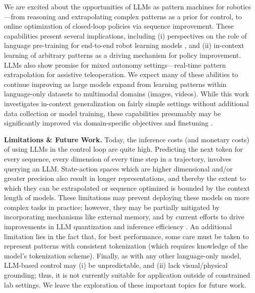 We are excited about the opportunities of LLMs as pattern machines for robotics---from reasoning and extrapolating complex patterns as a prior for control, to online optimization of closed-loop policies via sequence improvement. These capabilities present several implications, including (i) perspectives on the role of language pre-training for end-to-end robot learning models \cite{lu2021pretrained,reid2022can}, and (ii) in-context learning of arbitrary patterns as a driving mechanism for policy improvement. LLMs also show promise for mixed autonomy settings---\eg real-time pattern extrapolation for assistive teleoperation. We expect many of these abilities to continue improving as large models expand from learning  patterns within language-only datasets to multimodal domains (\eg images, videos). While this work investigates in-context generalization on fairly simple settings without additional data collection or model training, these capabilities presumably may be significantly improved via domain-specific objectives and finetuning \cite{li2022pre,driess2023palm,zhang2023motiongpt,lee2023supervised, dinh2022lift}.


\textbf{Limitations \& Future Work.} Today, the inference costs (and monetary costs) of using LLMs in the control loop are quite high. Predicting the next token for every sequence, \eg every dimension of every time step in a trajectory, involves querying an LLM. State-action spaces which are higher dimensional and/or greater precision also result in longer  representations, and thereby the extent to which they can be extrapolated or sequence optimized is bounded by the context length of models. These limitations may prevent deploying these models on more complex tasks in practice; however, they may be partially mitigated by incorporating mechanisms like external memory, and by current efforts to drive improvements in LLM quantization \cite{zafrir2019q8bert} and inference efficiency \cite{dao2022flashattention}. An additional limitation lies in the fact that, for best performance, some care must be taken to represent patterns with consistent tokenization (which requires knowledge of the model's tokenization scheme). Finally, as with any other language-only model, LLM-based control may (i) be unpredictable, and (ii) lack visual/physical grounding; thus, it is not currently suitable for application outside of constrained lab settings. We leave the exploration of these important topics for future work.
